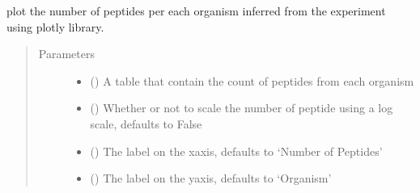 \documentclass[letterpaper,10pt,english]{sphinxmanual}
\begin{document}
\begin{fulllineitems}
\label{\detokenize{IPTK.Visualization:IPTK.Visualization.vizTools.plotly_num_peptides_per_organism}}
plot the number of peptides per each organism inferred from the experiment using plotly library.
\begin{quote}\begin{description}
\item[{Parameters}] \leavevmode\begin{itemize}
\item {} 
 () \textendash{} A table that contain the count of peptides from each organism

\item {} 
 (\sphinxstyleliteralemphasis{\sphinxupquote{, }}) \textendash{} Whether or not to scale the number of peptide using a log scale, defaults to False

\item {} 
 (\sphinxstyleliteralemphasis{\sphinxupquote{, }}) \textendash{} The label on the x\sphinxhyphen{}axis, defaults to ‘Number of Peptides’

\item {} 
 (\sphinxstyleliteralemphasis{\sphinxupquote{, }}) \textendash{} The label on the y\sphinxhyphen{}axis, defaults to ‘Organism’


\end{itemize}
\end{description}
\end{quote}
\end{fulllineitems}
\end{document}
